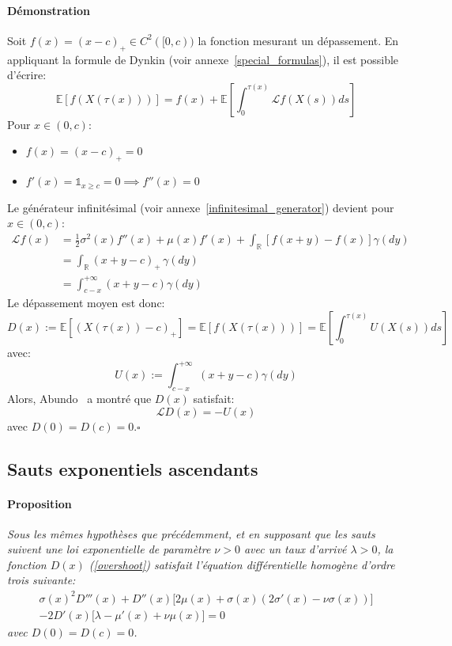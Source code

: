 \paragraph{Démonstration}
Soit $f(x)={(x-c)}_+\in C^2([0,c))$ la fonction mesurant un dépassement. En appliquant la formule de Dynkin (voir annexe~\ref{special_formulas}), il est possible d'écrire:
\begin{equation}\label{initial_dynkin}
    \mathds{E}[f(X(\tau(x)))]=f(x)+\mathds{E}\left[\int_0^{\tau(x)}\mathcal{L}f(X(s))ds\right]
\end{equation}
Pour $x\in(0,c)$:
\begin{itemize}
    \item $f(x)={(x-c)}_+=0$
    \item $f'(x)=\mathds{1}_{x\geq c}=0\implies f''(x)=0$
\end{itemize}
Le générateur infinitésimal (voir annexe~\ref{infinitesimal_generator}) devient pour \(x\in(0,c)\):
\[
\begin{aligned}
    \mathcal{L}f(x) &= \frac{1}{2}\sigma^2(x)f''(x)+\mu(x)f'(x)+\int_{\mathds{R}}[f(x+y)-f(x)]\gamma(dy)\\
    &=\int_{\mathds{R}}{(x+y-c)}_+\,\gamma(dy) \\
    &=\int_{c-x}^{+\infty}(x+y-c)\gamma(dy)
\end{aligned}
\]
Le dépassement moyen est donc:
\[
D(x):=\mathds{E}\left[{(X(\tau(x))-c)}_+\right]=\mathds{E}[f(X(\tau(x)))]=\mathds{E}\left[\int_0^{\tau(x)}U(X(s))ds\right]
\]
avec:
\[
U(x):=\int_{c-x}^{+\infty}(x+y-c)\gamma(dy)
\]
Alors, Abundo~\cite{abundo2013} a montré que $D(x)$ satisfait:
\begin{equation}\label{general_ide}
    \mathcal{L}D(x) = -U(x)
\end{equation}
avec $D(0)=D(c)=0$.\hfill$\square$

\subsection{Sauts exponentiels ascendants}
\paragraph{Proposition} 
\textit{Sous les mêmes hypothèses que précédemment, et en supposant que les sauts suivent une loi exponentielle de paramètre \(\nu > 0\) avec un taux d'arrivé \(\lambda > 0\), la fonction \(D(x)\) (\ref{overshoot}) satisfait l'équation différentielle homogène d'ordre trois suivante:}
\begin{equation}\label{eq:general_ode_D}
    \begin{aligned}
        \sigma(x)^2 D'''(x)+D''(x) \big[2 \mu(x)+\sigma(x)(2\sigma'(x)-\nu  \sigma(x))\big]\\-2D'(x)\big[\lambda-\mu'(x)+\nu\mu(x)\big]=0
    \end{aligned}
\end{equation}
\textit{avec \(D(0) = D(c) = 0\).}

